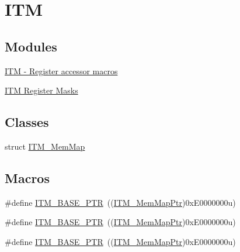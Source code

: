 \hypertarget{group___i_t_m___peripheral}{}\section{I\+TM}
\label{group___i_t_m___peripheral}
\subsection*{Modules}
\begin{DoxyCompactItemize}
\item 
\hyperlink{group___i_t_m___register___accessor___macros}{I\+T\+M -\/ Register accessor macros}
\item 
\hyperlink{group___i_t_m___register___masks}{I\+T\+M Register Masks}
\end{DoxyCompactItemize}
\subsection*{Classes}
\begin{DoxyCompactItemize}
\item 
struct \hyperlink{struct_i_t_m___mem_map}{I\+T\+M\+\_\+\+Mem\+Map}
\end{DoxyCompactItemize}
\subsection*{Macros}
\begin{DoxyCompactItemize}
\item 
\#define \hyperlink{group___i_t_m___peripheral_gafaddee8fe8b6a898d4e5edc43ee0d703}{I\+T\+M\+\_\+\+B\+A\+S\+E\+\_\+\+P\+TR}~((\hyperlink{group___i_t_m___peripheral_ga4a7413c0256960668a95765d8b74e5b3}{I\+T\+M\+\_\+\+Mem\+Map\+Ptr})0x\+E0000000u)
\item 
\#define \hyperlink{group___i_t_m___peripheral_gafaddee8fe8b6a898d4e5edc43ee0d703}{I\+T\+M\+\_\+\+B\+A\+S\+E\+\_\+\+P\+TR}~((\hyperlink{group___i_t_m___peripheral_ga4a7413c0256960668a95765d8b74e5b3}{I\+T\+M\+\_\+\+Mem\+Map\+Ptr})0x\+E0000000u)
\item 
\#define \hyperlink{group___i_t_m___peripheral_gafaddee8fe8b6a898d4e5edc43ee0d703}{I\+T\+M\+\_\+\+B\+A\+S\+E\+\_\+\+P\+TR}~((\hyperlink{group___i_t_m___peripheral_ga4a7413c0256960668a95765d8b74e5b3}{I\+T\+M\+\_\+\+Mem\+Map\+Ptr})0x\+E0000000u)
\end{DoxyCompactItemize}
